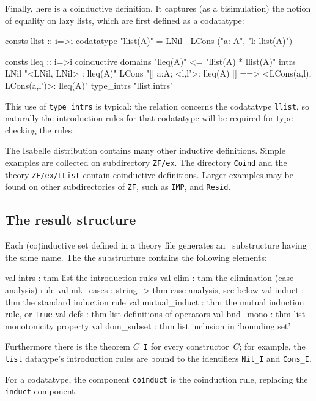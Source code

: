 Finally, here is a coinductive definition.  It captures (as a bisimulation)
the notion of equality on lazy lists, which are first defined as a codatatype:
\begin{ttbox}
consts  llist :: i=>i
codatatype  "llist(A)" = LNil | LCons ("a: A", "l: llist(A)")
\ttbreak

consts  lleq :: i=>i
coinductive
  domains "lleq(A)" <= "llist(A) * llist(A)"
  intrs
    LNil  "<LNil, LNil> : lleq(A)"
    LCons "[| a:A; <l,l'>: lleq(A) |] 
           ==> <LCons(a,l), LCons(a,l')>: lleq(A)"
  type_intrs  "llist.intrs"
\end{ttbox}
This use of \texttt{type_intrs} is typical: the relation concerns the
codatatype \texttt{llist}, so naturally the introduction rules for that
codatatype will be required for type-checking the rules.

The Isabelle distribution contains many other inductive definitions.  Simple
examples are collected on subdirectory \texttt{ZF/ex}.  The directory
\texttt{Coind} and the theory \texttt{ZF/ex/LList} contain coinductive
definitions.  Larger examples may be found on other subdirectories of
\texttt{ZF}, such as \texttt{IMP}, and \texttt{Resid}.


\subsection{The result structure}

Each (co)inductive set defined in a theory file generates an \ML\ substructure
having the same name.  The the substructure contains the following elements:

\begin{ttbox}
val intrs         : thm list  \textrm{the introduction rules}
val elim          : thm       \textrm{the elimination (case analysis) rule}
val mk_cases      : string -> thm  \textrm{case analysis, see below}
val induct        : thm       \textrm{the standard induction rule}
val mutual_induct : thm       \textrm{the mutual induction rule, or \texttt{True}}
val defs          : thm list  \textrm{definitions of operators}
val bnd_mono      : thm list  \textrm{monotonicity property}
val dom_subset    : thm list  \textrm{inclusion in `bounding set'}
\end{ttbox}
Furthermore there is the theorem $C$\texttt{_I} for every constructor~$C$; for
example, the \texttt{list} datatype's introduction rules are bound to the
identifiers \texttt{Nil_I} and \texttt{Cons_I}.

For a codatatype, the component \texttt{coinduct} is the coinduction rule,
replacing the \texttt{induct} component.

